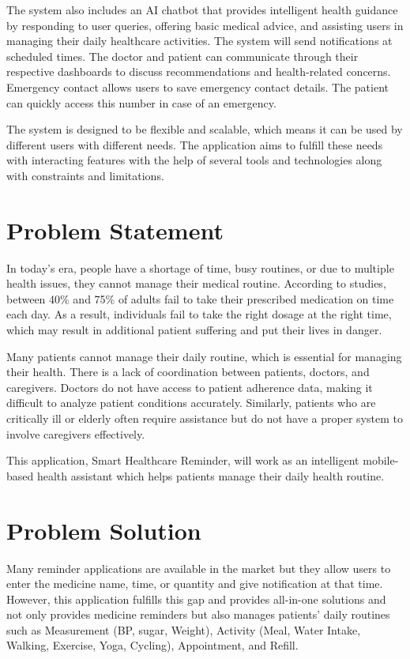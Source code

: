 \documentclass[12pt, a4paper, oneside]{report}
\begin{document}
The system also includes an AI chatbot that provides intelligent health guidance by responding to user queries, offering basic medical advice, and assisting users in managing their daily healthcare activities. The system will send notifications at scheduled times. The doctor and patient can communicate through their respective dashboards to discuss recommendations and health-related concerns. Emergency contact allows users to save emergency contact details. The patient can quickly access this number in case of an emergency.

The system is designed to be flexible and scalable, which means it can be used by different users with different needs. The application aims to fulfill these needs with interacting features with the help of several tools and technologies along with constraints and limitations.

\section{Problem Statement}
\label{sec:problem-statement}

In today's era, people have a shortage of time, busy routines, or due to multiple health issues, they cannot manage their medical routine. According to studies, between 40\% and 75\% of adults fail to take their prescribed medication on time each day. As a result, individuals fail to take the right dosage at the right time, which may result in additional patient suffering and put their lives in danger.

Many patients cannot manage their daily routine, which is essential for managing their health. There is a lack of coordination between patients, doctors, and caregivers. Doctors do not have access to patient adherence data, making it difficult to analyze patient conditions accurately. Similarly, patients who are critically ill or elderly often require assistance but do not have a proper system to involve caregivers effectively.

This application, Smart Healthcare Reminder, will work as an intelligent mobile-based health assistant which helps patients manage their daily health routine.

\section{Problem Solution}
\label{sec:problem-solution}

Many reminder applications are available in the market but they allow users to enter the medicine name, time, or quantity and give notification at that time. However, this application fulfills this gap and provides all-in-one solutions and not only provides medicine reminders but also manages patients' daily routines such as Measurement (BP, sugar, Weight), Activity (Meal, Water Intake, Walking, Exercise, Yoga, Cycling), Appointment, and Refill.
\end{document}
